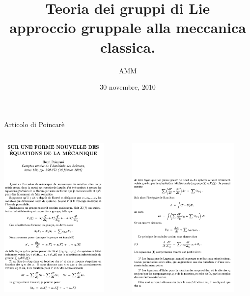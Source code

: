 \documentclass{beamer}
\title[Le equazioni di Eulero Poincare']{ Teoria dei gruppi di Lie \\ approccio gruppale alla meccanica classica.}
\author{AMM}
\institute{Universita' Milano Bicocca}
\date{30 novembre, 2010}
\begin{document}
\begin{frame}
\titlepage
\end{frame}

\begin{frame}{Articolo di Poincarè}
\begin{columns}
\begin{column}[l]{.5\textwidth}
\includegraphics[height=8cm]{Articolo/poincare_epag1}
\end{column}
\begin{column}[r]{.5\textwidth}
\includegraphics[height=8cm]{Articolo/poincare_epag2}
\end{column}
\end{columns}
\end{frame}
\end{document}
